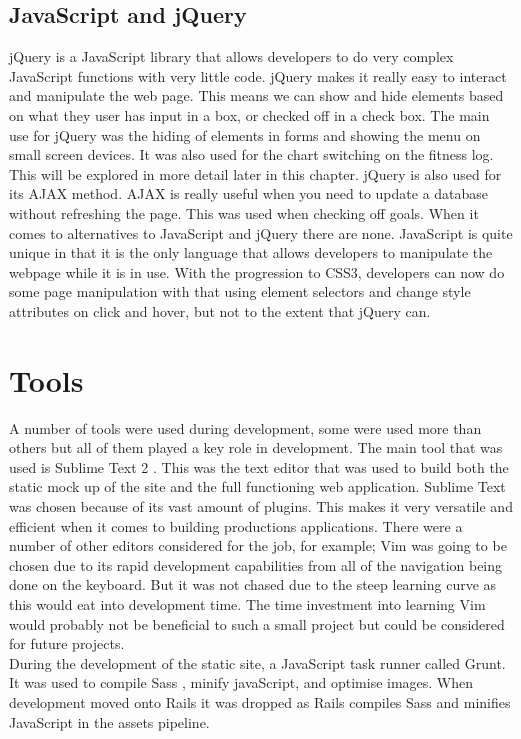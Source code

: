 \subsection{JavaScript and jQuery}
jQuery is a JavaScript library that allows developers to do very complex JavaScript functions with very little code. jQuery makes it really easy to interact and manipulate the web page. This means we can show and hide elements based on what they user has input in a box, or checked off in a check box. The main use for jQuery was the hiding of elements in forms and showing the menu on small screen devices. It was also used for the chart switching on the fitness log. This will be explored in more detail later in this chapter. jQuery is also used for its AJAX method. AJAX is really useful when you need to update a database without refreshing the page. This was used when checking off goals. When it comes to alternatives to JavaScript and jQuery there are none. JavaScript is quite unique in that it is the only language that allows developers to manipulate the webpage while it is in use. With the progression to CSS3, developers can now do some page manipulation with that using element selectors and change style attributes on click and hover, but not to the extent that jQuery can.\\

\section{Tools}
A number of tools were used during development, some were used more than others but all of them played a key role in development. The main tool that was used is Sublime Text 2 \citep{sublimetext:2011}. This was the text editor that was used to build both the static mock up of the site and the full functioning web application. Sublime Text was chosen because of its vast amount of plugins. This makes it very versatile and efficient when it comes to building productions applications. There were a number of other editors considered for the job, for example; Vim \citep{vim:2013} was going to be chosen due to its rapid development capabilities from all of the navigation being done on the keyboard. But it was not chased due to the steep learning curve as this would eat into development time. The time investment into learning Vim would probably not be beneficial to such a small project but could be considered for future projects.\\

During the development of the static site, a JavaScript task runner called Grunt. It was used to compile Sass \citep{sass:2006}, minify javaScript, and optimise images. When development moved onto Rails it was dropped as Rails compiles Sass and minifies JavaScript in the assets pipeline.\\

